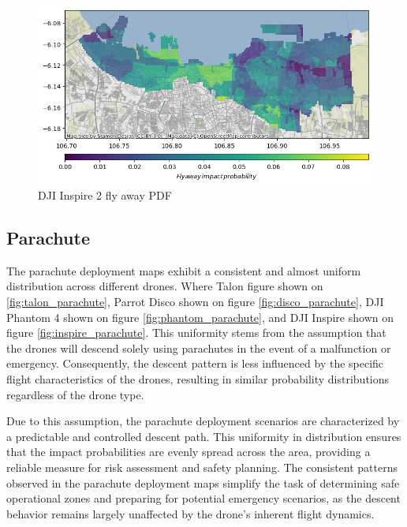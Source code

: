 \documentclass[12pt]{report}
\begin{document}
        \begin{figure}[H]
            \centering
            \includegraphics[width=\textwidth]{Plot/inspire/fly_away_pdf.png}
            \caption{DJI Inspire 2 fly away PDF}
            \label{fig:inspire_flyaway}
        \end{figure}

        \subsection{Parachute}
        The parachute deployment maps exhibit a consistent and almost uniform distribution across different drones.
        Where Talon figure shown on \ref{fig:talon_parachute}, Parrot Disco shown on figure \ref{fig:disco_parachute},
        DJI Phantom 4 shown on figure \ref{fig:phantom_parachute}, and DJI Inspire shown on figure
        \ref{fig:inspire_parachute}. This uniformity stems from the assumption that the drones will descend solely using
        parachutes in the event of a malfunction or emergency. Consequently, the descent pattern is less influenced by
        the specific flight characteristics of the drones, resulting in similar probability distributions regardless of
        the drone type.
            
        Due to this assumption, the parachute deployment scenarios are characterized by a predictable and controlled
        descent path. This uniformity in distribution ensures that the impact probabilities are evenly spread across the
        area, providing a reliable measure for risk assessment and safety planning. The consistent patterns observed in
        the parachute deployment maps simplify the task of determining safe operational zones and preparing for
        potential emergency scenarios, as the descent behavior remains largely unaffected by the drone's inherent flight
        dynamics.
        
\end{document}
